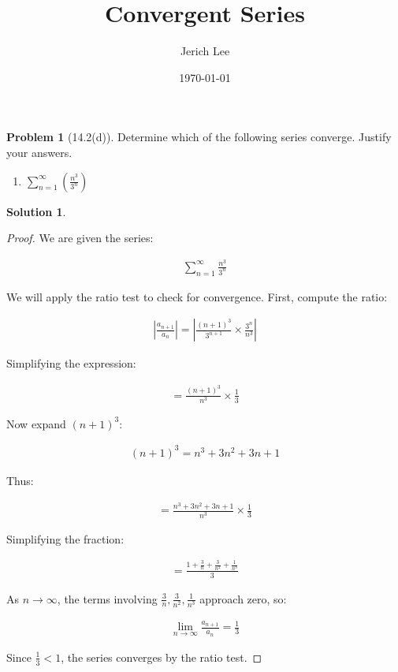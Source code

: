 \documentclass[12pt]{article}
\title{Convergent Series}
\author{Jerich Lee}
\date{\today}
\theoremstyle{definition} %
\newtheorem{solution}{Solution}
\newtheorem{problem}{Problem}
\theoremstyle{plain} %
\begin{document}
\maketitle
\begin{problem}[14.2(d)]
   Determine which of the following series converge. Justify your answers.
   \begin{enumerate}
    \item $\sum_{n=1}^{\infty} (\frac{n^{3}}{3^{n} })$ 
   \end{enumerate} 
\end{problem}
\begin{solution}
   \begin{proof}
      We are given the series:

\begin{align}
\sum_{n=1}^{\infty} \frac{n^3}{3^n}
\end{align}

We will apply the ratio test to check for convergence. First, compute the ratio:

\begin{align}
\left| \frac{a_{n+1}}{a_n} \right| = \left| \frac{(n+1)^3}{3^{n+1}} \times \frac{3^n}{n^3} \right|
\end{align}

Simplifying the expression:

\begin{align}
= \frac{(n+1)^3}{n^3} \times \frac{1}{3}
\end{align}

Now expand $(n+1)^3$:

\begin{align}
(n+1)^3 = n^3 + 3n^2 + 3n + 1
\end{align}

Thus:

\begin{align}
= \frac{n^3 + 3n^2 + 3n + 1}{n^3} \times \frac{1}{3}
\end{align}

Simplifying the fraction:

\begin{align}
= \frac{1 + \frac{3}{n} + \frac{3}{n^2} + \frac{1}{n^3}}{3}
\end{align}

As $ n \to \infty $, the terms involving $ \frac{3}{n}, \frac{3}{n^2}, \frac{1}{n^3} $ approach zero, so:

\begin{align}
\lim_{n \to \infty} \frac{a_{n+1}}{a_n} = \frac{1}{3}
\end{align}

Since $ \frac{1}{3} < 1 $, the series converges by the ratio test.




   \end{proof}

\end{solution}
\end{document}
